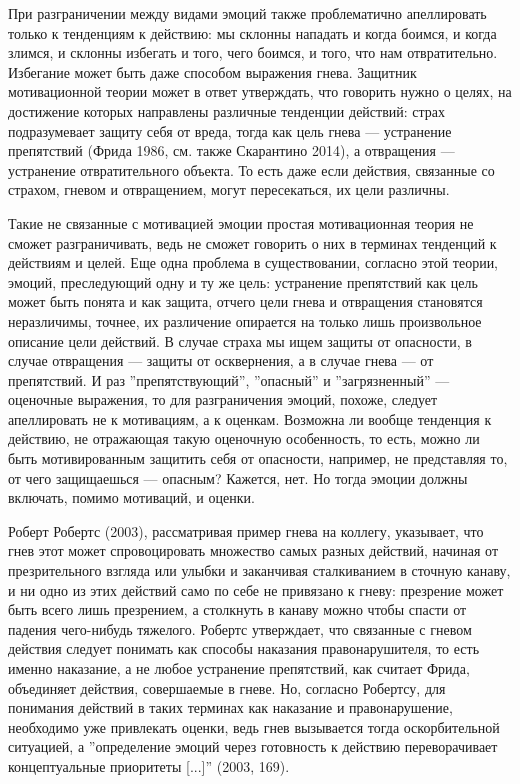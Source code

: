 \documentclass[11pt]{book}
\begin{document}
При разграничении между видами эмоций также проблематично апеллировать только к тенденциям к действию: мы склонны нападать и когда боимся, и когда злимся, и склонны избегать и того, чего боимся, и того, что нам отвратительно. Избегание может быть даже способом выражения гнева. Защитник мотивационной теории может в ответ утверждать, что говорить нужно о целях, на достижение которых направлены различные тенденции действий: страх подразумевает защиту себя от вреда, тогда как цель гнева --- устранение препятствий (Фрида 1986, см. также Скарантино 2014), а отвращения --- устранение отвратительного объекта. То есть даже если действия, связанные со страхом, гневом и отвращением, могут пересекаться, их цели различны.

Такие не связанные с мотивацией эмоции простая мотивационная теория не сможет разграничивать, ведь не сможет говорить о них в терминах тенденций к действиям и целей. Еще одна проблема в существовании, согласно этой теории, эмоций, преследующий одну и ту же цель: устранение препятствий как цель может быть понята и как защита, отчего цели гнева и отвращения становятся неразличимы, точнее, их различение опирается на только лишь произвольное описание цели действий. В случае страха мы ищем защиты от опасности, в случае отвращения --- защиты от осквернения, а в случае гнева --- от препятствий. И раз ''препятствующий'', ''опасный'' и ''загрязненный'' --- оценочные выражения, то для разграничения эмоций, похоже, следует апеллировать не к мотивациям, а к оценкам. Возможна ли вообще тенденция к действию, не отражающая такую оценочную особенность, то есть, можно ли быть мотивированным защитить себя от опасности, например, не представляя то, от чего защищаешься --- опасным? Кажется, нет. Но тогда эмоции должны включать, помимо мотиваций, и оценки.

Роберт Робертс (2003), рассматривая пример гнева на коллегу, указывает, что гнев этот может спровоцировать множество самых разных действий, начиная от презрительного взгляда или улыбки и заканчивая сталкиванием в сточную канаву, и ни одно из этих действий само по себе не привязано к гневу: презрение может быть всего лишь презрением, а столкнуть в канаву можно чтобы спасти от падения чего-нибудь тяжелого. Робертс утверждает, что связанные с гневом действия следует понимать как способы наказания правонарушителя, то есть именно наказание, а не любое устранение препятствий, как считает Фрида, объединяет действия, совершаемые в гневе. Но, согласно Робертсу, для понимания действий в таких терминах как наказание и правонарушение, необходимо уже привлекать оценки, ведь гнев вызывается тогда оскорбительной ситуацией, а ''определение эмоций через готовность к действию переворачивает концептуальные приоритеты [...]'' (2003, 169).
\end{document}
